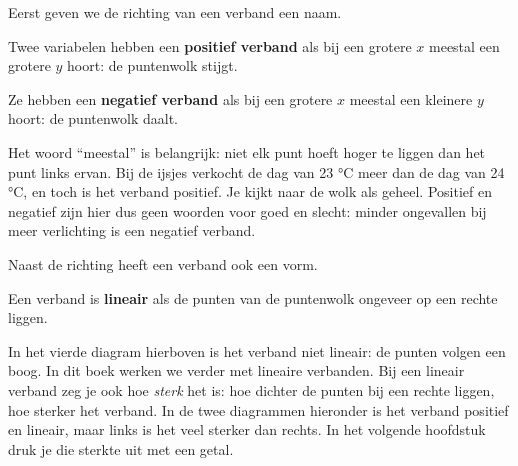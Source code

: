 Eerst geven we de richting van een verband een naam.

\begin{theorie}
Twee variabelen hebben een \textbf{\textcolor{accent}{positief verband}} als bij een grotere $x$ meestal een grotere $y$ hoort: de puntenwolk stijgt.

\vspace{1mm}
Ze hebben een \textbf{\textcolor{accent}{negatief verband}} als bij een grotere $x$ meestal een kleinere $y$ hoort: de puntenwolk daalt.
\end{theorie}

Het woord ``meestal'' is belangrijk: niet elk punt hoeft hoger te liggen dan het punt links ervan. Bij de ijsjes verkocht de dag van 23 °C meer dan de dag van 24 °C, en toch is het verband positief. Je kijkt naar de wolk als geheel. Positief en negatief zijn hier dus geen woorden voor goed en slecht: minder ongevallen bij meer verlichting is een negatief verband.

Naast de richting heeft een verband ook een vorm.

\begin{theorie}
Een verband is \textbf{\textcolor{accent}{lineair}} als de punten van de puntenwolk ongeveer op een rechte liggen.
\end{theorie}

In het vierde diagram hierboven is het verband niet lineair: de punten volgen een boog. In dit boek werken we verder met lineaire verbanden. Bij een lineair verband zeg je ook hoe \textit{sterk} het is: hoe dichter de punten bij een rechte liggen, hoe sterker het verband. In de twee diagrammen hieronder is het verband positief en lineair, maar links is het veel sterker dan rechts. In het volgende hoofdstuk druk je die sterkte uit met een getal.


